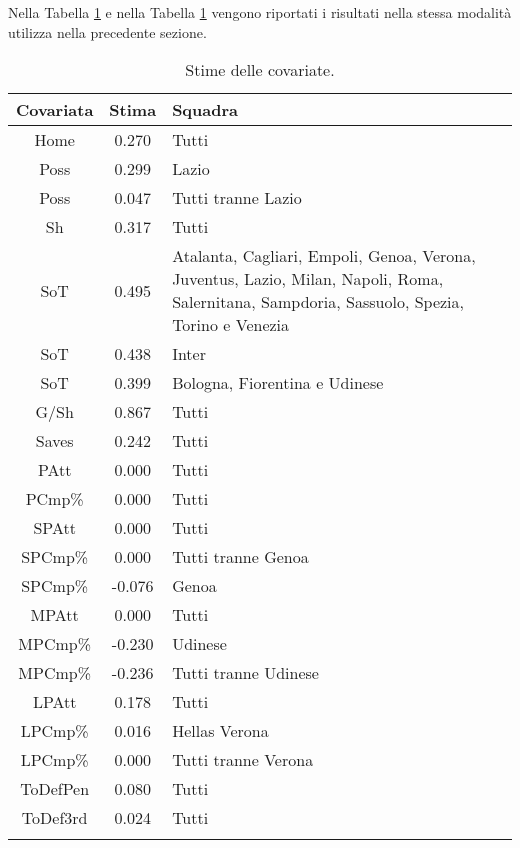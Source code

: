 Nella Tabella \ref{tab:BTCLI2} e nella Tabella \ref{tab:BTCLI2} vengono riportati i risultati nella stessa modalità utilizza nella precedente sezione.
\begin{table}[]%
	
	\renewcommand{\arraystretch}{1.7}
	\centering
	\begin{tabular}{ccp{10cm}}
		\hline	
		
		\textbf{Covariata} & \textbf{Stima} & \textbf{Squadra} \\	
		\hline
		Home & 0.270 & Tutti\\
		Poss & 0.299 & Lazio \\
		Poss & 0.047 & Tutti tranne Lazio\\
		Sh & 0.317 & Tutti \\
		SoT & 0.495 & Atalanta, Cagliari, Empoli, Genoa, Verona, Juventus, Lazio, Milan, Napoli, Roma, Salernitana, Sampdoria, Sassuolo, Spezia, Torino e Venezia\\
		SoT & 0.438 & Inter\\
		SoT & 0.399 & Bologna, Fiorentina e Udinese \\
		G/Sh & 0.867 & Tutti \\
		Saves & 0.242 & Tutti \\
		PAtt & 0.000 & Tutti \\
		PCmp\% & 0.000 & Tutti \\
		SPAtt & 0.000 & Tutti \\
		SPCmp\% & 0.000 & Tutti tranne Genoa \\ 
		SPCmp\% & -0.076 & Genoa \\	
		MPAtt & 0.000 & Tutti \\ 
		MPCmp\% & -0.230 & Udinese \\
		MPCmp\% & -0.236 & Tutti tranne Udinese \\		
		LPAtt & 0.178 & Tutti \\
		LPCmp\% & 0.016 & Hellas Verona \\
		LPCmp\% & 0.000 & Tutti tranne Verona \\
		ToDefPen & 0.080 & Tutti \\      
		ToDef3rd & 0.024 & Tutti \\
		
		
		\hline
		& &  \\
		
	\end{tabular} \hbox{}
	\caption{Stime delle covariate.} \label{tab:BTCLI2} 
	
\end{table}

